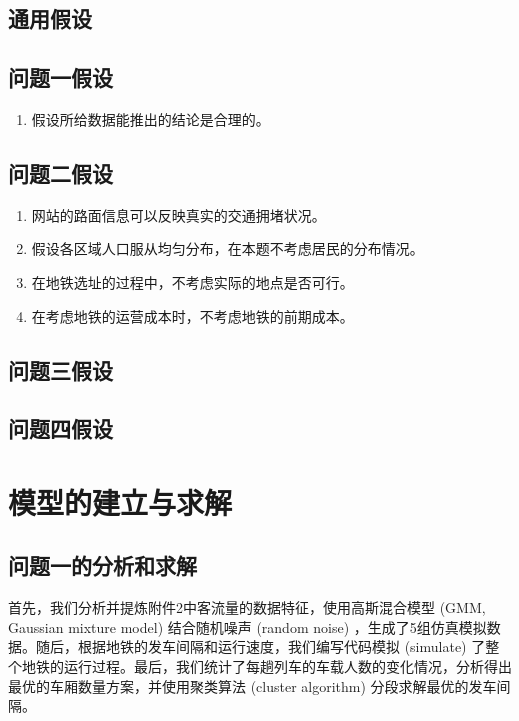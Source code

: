 \documentclass[12pt,a4paper]{mcmthesis}
\begin{document}
\subsection{通用假设}
\subsection{问题一假设}
\begin{enumerate}
	\item 假设所给数据能推出的结论是合理的。
\end{enumerate}
\subsection{问题二假设}
\begin{enumerate}
	\item 网站的路面信息可以反映真实的交通拥堵状况。
	\item 假设各区域人口服从均匀分布，在本题不考虑居民的分布情况。
	\item 在地铁选址的过程中，不考虑实际的地点是否可行。
	\item 在考虑地铁的运营成本时，不考虑地铁的前期成本。

\end{enumerate}

\subsection{问题三假设}
\subsection{问题四假设}

\section{模型的建立与求解}

\subsection{问题一的分析和求解}

首先，我们分析并提炼附件2中客流量的数据特征，使用高斯混合模型 (GMM, Gaussian mixture model) 结合随机噪声 (random noise) ，生成了5组仿真模拟数据。随后，根据地铁的发车间隔和运行速度，我们编写代码模拟 (simulate) 了整个地铁的运行过程。最后，我们统计了每趟列车的车载人数的变化情况，分析得出最优的车厢数量方案，并使用聚类算法 (cluster algorithm) 分段求解最优的发车间隔。
\end{document}

